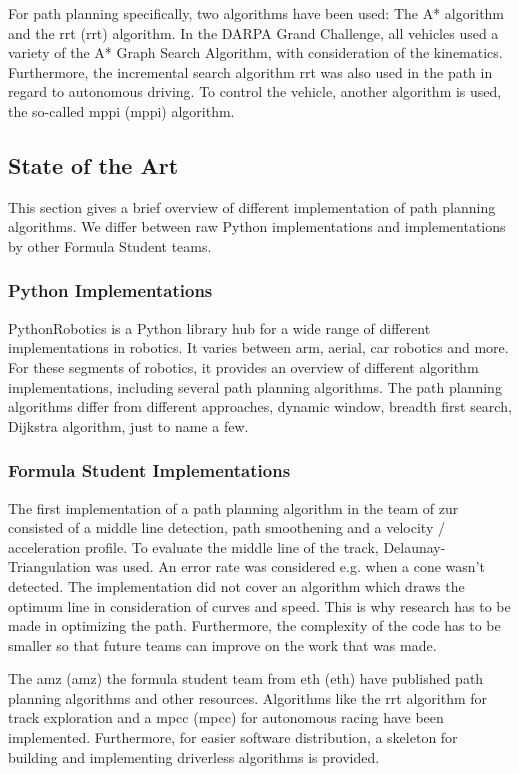 For path planning specifically, two algorithms have been used: The A* algorithm and the \acrlong{rrt} (\acrshort{rrt}) algorithm. In the DARPA Grand Challenge, all vehicles used a variety of the A* Graph Search Algorithm, with consideration of the kinematics. Furthermore, the incremental search algorithm \acrshort{rrt} was also used in the path in regard to autonomous driving.
To control the vehicle, another algorithm is used, the so-called \acrlong{mppi} (\acrshort{mppi}) algorithm.
\cite{path_planning_and_control_georgiev}

\subsection{State of the Art}
This section gives a brief overview of different implementation of path planning algorithms. We differ between raw Python implementations and implementations by other Formula Student teams.

\subsubsection{Python Implementations}
PythonRobotics is a Python library hub for a wide range of different implementations in robotics. It varies between arm, aerial, car robotics and more.
For these segments of robotics, it provides an overview of different algorithm implementations, including several path planning algorithms.
The path planning algorithms differ from different approaches, dynamic window, breadth first search, Dijkstra algorithm, just to name a few. 
\cite{python_robotics}

\subsubsection{Formula Student Implementations}
The first implementation of a path planning algorithm in the team of \acrlong{zur} consisted of a middle line detection, path smoothening and a velocity / acceleration profile. To evaluate the middle line of the track, Delaunay-Triangulation was used. An error rate was considered e.g. when a cone wasn't detected. The implementation did not cover an algorithm which draws the optimum line in consideration of curves and speed. This is why research has to be made in optimizing the path. Furthermore, the complexity of the code has to be smaller so that future teams can improve on the work that was made.
\cite{autopilot_for_formula_student_jerome}

The \acrshort{amz} (\acrlong{amz}) the formula student team from \acrshort{eth} (\acrlong{eth}) have published path planning algorithms and other resources. Algorithms like the \acrshort{rrt} algorithm for track exploration and a \acrlong{mpcc} (\acrshort{mpcc}) for autonomous racing have been implemented. Furthermore, for easier software distribution, a skeleton for building and implementing driverless algorithms is provided.
\cite{amz_racing_github}

